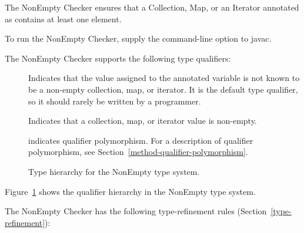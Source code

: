\htmlhr
{}

The NonEmpty Checker ensures that a Collection, Map, or an Iterator annotated as
 contains at least one element.

To run the NonEmpty Checker, supply the
command-line option to javac.

The NonEmpty Checker supports the following type qualifiers:
\begin{description}

    \item[]
    Indicates that the value assigned to the annotated variable is not known to be a non-empty
    collection, map, or iterator. It is the default type
    qualifier, so it should rarely be written by a programmer.

    \item[]
    Indicates that a collection, map, or iterator value is non-empty.

    \item[]
    indicates qualifier polymorphism.
    For a description of qualifier polymorphism, see
    Section~\ref{method-qualifier-polymorphism}.

\end{description}

\begin{figure}
    \caption{Type hierarchy for the NonEmpty type system.}
    \label{fig-nonempty-hierarchy}
\end{figure}

Figure~\ref{fig-nonempty-hierarchy} shows the qualifier hierarchy in the NonEmpty type system.


The NonEmpty Checker has the following type-refinement rules (Section~\ref{type-refinement}):

